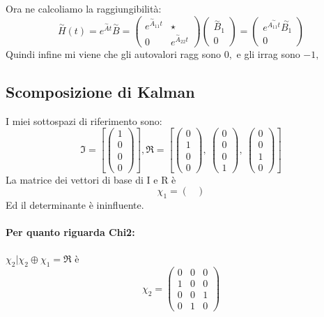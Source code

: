 \documentclass{article}
\begin{document}
Ora ne calcoliamo la raggiungibilità: \[ \overset{\sim}{H}(t) = e^{\overset{\sim}{A}t}\overset{\sim}{B} = \begin{pmatrix} e^{\overset{\sim}{A}_{11}t} &  \star \\ 0 & e^{\overset{\sim}{A}_{22}t} \end{pmatrix} \begin{pmatrix} \overset{\sim}{B}_1 \\ 0 \end{pmatrix} = \begin{pmatrix} e^{\overset{\sim}{A_{11}t}}\overset{\sim}{B_1} \\ 0 \end{pmatrix} \]
Quindi infine mi viene che gli autovalori ragg sono $ 0,  $ e gli irrag sono $ -1,  $
\subsection{Scomposizione di Kalman}
I miei sottospazi di riferimento sono:	\[ \mathfrak{I} = \left[ \left(\begin{matrix}1\\0\\0\\0\end{matrix}\right)\right], \mathfrak{R} = \left[ \left(\begin{matrix}0\\1\\0\\0\end{matrix}\right), \  \left(\begin{matrix}0\\0\\0\\1\end{matrix}\right), \  \left(\begin{matrix}0\\0\\1\\0\end{matrix}\right)\right] \]
La matrice dei vettori di base di I e R è \[ \chi_1 =  \left(\begin{matrix}\end{matrix}\right) \]Ed il determinante è ininfluente.
\paragraph{Per quanto riguarda Chi2:} $ \chi_2 | \chi_2 \oplus \chi_1 = \mathfrak{R} $ è \[ \chi_2 = \left(\begin{matrix}0 & 0 & 0\\1 & 0 & 0\\0 & 0 & 1\\0 & 1 & 0\end{matrix}\right) \]
\end{document}
